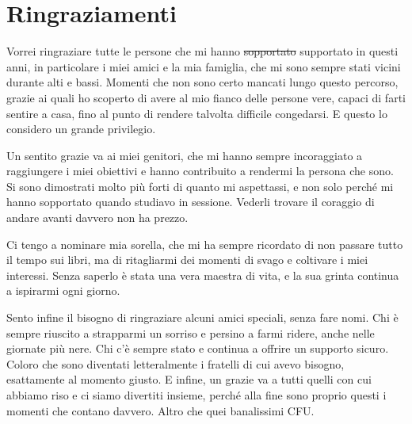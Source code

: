 \rhead[\fancyplain{}{\bfseries \leftmark}]{\fancyplain{}{\bfseries
\thepage}}

\clearpage{\pagestyle{empty}\cleardoublepage}
\chapter*{Ringraziamenti}
\thispagestyle{empty}



Vorrei ringraziare tutte le persone che mi hanno \sout{sopportato} supportato in questi anni, in particolare i miei amici e la mia famiglia, che mi sono sempre stati vicini durante alti e bassi. Momenti che non sono certo mancati lungo questo percorso, grazie ai quali ho scoperto di avere al mio fianco delle persone vere, capaci di farti sentire a casa, fino al punto di rendere talvolta difficile congedarsi. E questo lo considero un grande privilegio.

Un sentito grazie va ai miei genitori, che mi hanno sempre incoraggiato a raggiungere i miei obiettivi e hanno contribuito a rendermi la persona che sono. Si sono dimostrati molto più forti di quanto mi aspettassi, e non solo perché mi hanno sopportato quando studiavo in sessione. Vederli trovare il coraggio di andare avanti davvero non ha prezzo.

Ci tengo a nominare mia sorella, che mi ha sempre ricordato di non passare tutto il tempo sui libri, ma di ritagliarmi dei momenti di svago e coltivare i miei interessi. Senza saperlo è stata una vera maestra di vita, e la sua grinta continua a ispirarmi ogni giorno.

Sento infine il bisogno di ringraziare alcuni amici speciali, senza fare nomi. Chi è sempre riuscito a strapparmi un sorriso e persino a farmi ridere, anche nelle giornate più nere. Chi c'è sempre stato e continua a offrire un supporto sicuro. Coloro che sono diventati letteralmente i fratelli di cui avevo bisogno, esattamente al momento giusto. E infine, un grazie va a tutti quelli con cui abbiamo riso e ci siamo divertiti insieme, perché alla fine sono proprio questi i momenti che contano davvero. Altro che quei banalissimi CFU.
